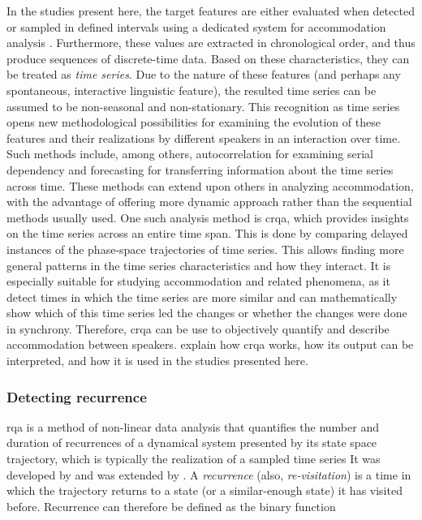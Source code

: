 In the studies present here, the target features are either evaluated when detected or sampled in defined intervals using a dedicated system for accommodation analysis \citep{Raveh2018Specom}.
Furthermore, these values are extracted in chronological order, and thus produce sequences of discrete-time data.
Based on these characteristics, they can be treated as \emph{time series}.
Due to the nature of these features (and perhaps any spontaneous, interactive linguistic feature), the resulted time series can be assumed to be non-seasonal and non-stationary.
This recognition as time series opens new methodological possibilities for examining the evolution of these features and their realizations by different speakers in an interaction over time.
Such methods include, among others, autocorrelation for examining serial dependency and forecasting for transferring information about the time series across time.
These methods can extend upon others in analyzing accommodation, with the advantage of offering more dynamic approach rather than the sequential methods usually used.
One such analysis method is \acf{crqa}, which provides insights on the time series across an entire time span.
This is done by comparing delayed instances of the phase-space trajectories of time series.
This allows finding more general patterns in the time series characteristics and how they interact.
It is especially suitable for studying accommodation and related phenomena, as it detect times in which the time series are more similar and can mathematically show which of this time series led the changes or whether the changes were done in synchrony.
Therefore, \ac{crqa} can be use to objectively quantify and describe accommodation between speakers.
 explain how \ac{crqa} works, how its output can be interpreted, and how it is used in the studies presented here.

\subsubsection{Detecting recurrence}
\label{subsubsec:detecting_recurrence}

\Ac{rqa} is a method of non-linear data analysis that quantifies the number and duration of recurrences of a dynamical system presented by its state space trajectory, which is typically the realization of a sampled time series
It was developed by \citet{Zbilut1992embeddings} and was extended by \citet{Webber2005recurrence,Marwan2002cross}.
A \emph{recurrence} (also, \emph{re-visitation}) is a time in which the trajectory returns to a state (or a similar-enough state) it has visited before.
Recurrence can therefore be defined as the binary function


